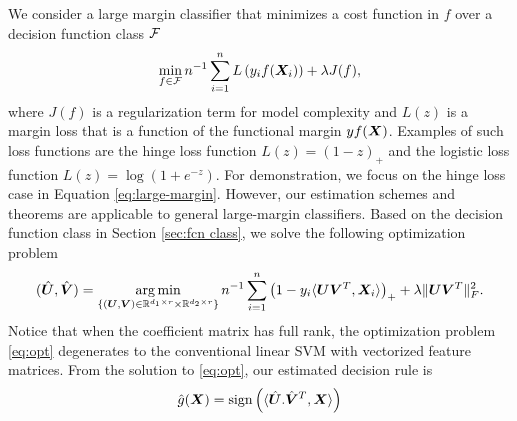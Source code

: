 \documentclass[12pt]{article}
\begin{document}
We consider  a large margin classifier that minimizes a cost function in $f$ over a decision function class $\mathcal{F}$
\begin{align}
\label{eq:large-margin}
\min_{f\in\mathcal{F}}n^{-1}\sum_{i=1}^n L\left(y_i f(\bm X_i)\right)+\lambda J(f),
\end{align}
where $J(f)$ is a regularization term for model complexity and $L(z)$ is a margin loss that is a function of the functional margin $yf(\bm X)$. Examples of such loss functions are the hinge loss function $L(z) = (1-z)_+$ and the logistic loss function $L(z) =\log(1+e^{-z})$.  For demonstration, we focus on the hinge loss case in Equation \eqref{eq:large-margin}. However, our estimation schemes and theorems are applicable to general large-margin classifiers.
Based on the decision function class in Section \ref{sec:fcn class}, we solve the following optimization problem
\begin{align}
\label{eq:opt}
(\hat {\bm{U}},\hat {\bm{V}}) = \operatorname*{arg\,min}_{\{(\bm{U},\bm{V})\in\mathbb{R}^{d_1\times r}\times \mathbb{R}^{d_2\times r}\}}n^{-1}\sum_{i=1}^n \left(1-y_i\langle \bm{U}\bm{V}^T,\bm X_i\rangle\right)_++\lambda \lVert\bm{U}\bm{V}^T\rVert_F^2.
\end{align}
Notice that when the coefficient matrix has full rank, the optimization problem \eqref{eq:opt} degenerates to the conventional linear SVM with vectorized feature matrices. From the solution to \eqref{eq:opt}, our estimated decision rule is \begin{align}\hat g(\bm X) = \text{sign}\left(\langle \hat{\bm{U}}. \hat{\bm{V}}^T,\bm X\rangle\right)\end{align}
\end{document}
